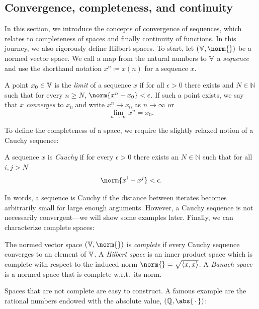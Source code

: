 \subsection{Convergence, completeness, and continuity}
In this section, we introduce the concepts of convergence of sequences, which relates to completeness of spaces and finally continuity of functions.
In this journey, we also rigorously define Hilbert spaces.
To start, let \( (\V, \norm{}) \) be a normed vector space.
We call a map from the natural numbers to \( \mathbb{V} \) a \emph{sequence} and use the shorthand notation \( x^n \coloneqq x(n) \) for a sequence \( x \).
\begin{definition}%
	\label{def:limit and convergence of a sequence}
	A point \( x_{\num{0}} \in \mathbb{V} \) is the \emph{limit} of a sequence \( x \) if for all \( \epsilon > \num{0} \) there exists and \( N \in \mathbb{N} \) such that for every \( n \geq N \), \( \norm{x^n - x_{\num{0}}} < \epsilon \).
	If such a point exists, we say that \( x \) \emph{converges} to \( x_{\num{0}} \) and write \( x^n \to x_{\num{0}} \) as \( n \to \infty \) or
	\[
		\lim_{n\to\infty} x^n = x_{\num{0}}.
	\]
\end{definition}
To define the completeness of a space, we require the slightly relaxed notion of a Cauchy sequence:
\begin{definition}%
	\label{def:cauchy sequence}
	A sequence \( x \) is \emph{Cauchy} if for every \( \epsilon > \num{0} \) there exists an \( N \in \mathbb{N} \) such that for all \( i, j > N \)
	\[
		\norm{x^i - x^j} < \epsilon.
	\]
\end{definition}
In words, a sequence is Cauchy if the distance between iterates becomes arbitrarily small for large enough arguments.
However, a Cauchy sequence is not necessarily convergent---we will show some examples later.
Finally, we can characterize complete spaces:
\begin{definition}[Completeness]%
	\label{def:completeness}
	The normed vector space \( (\V, \norm{}) \) is \emph{complete} if every Cauchy sequence converges to an element of \( \mathbb{V} \).
	A \emph{Hilbert space} is an inner product space which is complete with respect to the induced norm \( \norm{} = \sqrt{\inprod{x}{x}} \).
	A \emph{Banach space} is a normed space that is complete w.r.t.\ its norm.
\end{definition}
Spaces that are not complete are easy to construct.
A famous example are the rational numbers endowed with the absolute value, \( (\mathbb{Q}, \abs{\argm}) \):
